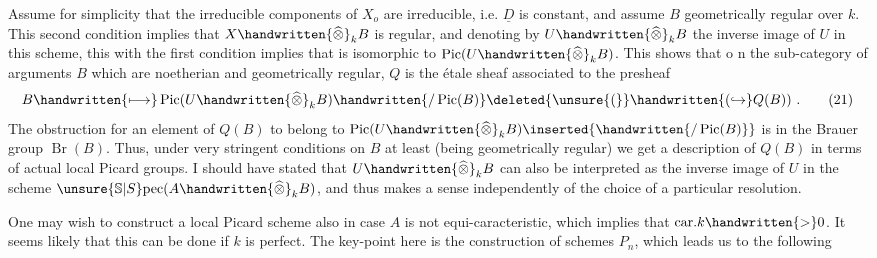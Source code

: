Assume for simplicity that the irreducible components of $X_o$ are
 irreducible, i.e. $\underline{D}$ is constant, and assume $B$ geometrically regular over $k$. This second condition implies that $X\handwritten{\widehat{\otimes}}_k B$ is regular, and denoting by $U\handwritten{\widehat{\otimes}}_k B$ the inverse image of $U$ in this scheme,  this  with the first condition implies that  is isomorphic to $\operatorname{Pic}(U\handwritten{\widehat{\otimes}}_k B)$. This shows that o n the sub-category of arguments $B$ which are  noetherian and geometrically regular, $Q$ is the étale sheaf associated to the presheaf
\[
B\handwritten{\longmapsto}\operatorname{Pic}(U\handwritten{\widehat{\otimes}}_k B)\handwritten{/\operatorname{Pic}(B)}\deleted{\unsure{(}}\handwritten{(\hookrightarrow}Q(B))\ .
\tag*{(21)}
\]
The obstruction for an element of $Q(B)$ to belong to $\operatorname{Pic}(U\handwritten{\widehat{\otimes}}_k B)\inserted{\handwritten{/\operatorname{Pic}(B)}}$ is in the Brauer group $\operatorname{Br}(B)$. Thus, under very stringent conditions on $B$ at least (being geometrically regular) we get a description of $Q(B)$ in terms of actual local Picard groups. I should have stated that $U\handwritten{\widehat{\otimes}}_k B$ can also be interpreted as the inverse image of $U$ in the scheme $\unsure{\mathbb{S}|S}\mathrm{pec}(A\handwritten{\widehat{\otimes}}_k B)$, and thus makes a sense independently of the choice of a particular resolution.

One may wish to construct a local Picard scheme  also in case $A$ is not equi-caracteristic, which implies that $\mathrm{car}.k\handwritten{>}0$. It seems likely that this can be done if $k$ is perfect. The key-point here   is the construction of schemes $P_n$, which leads us to the following

